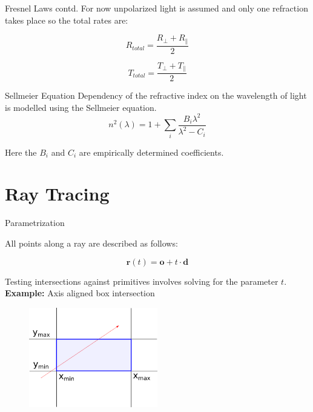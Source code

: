 \documentclass[aspectratio=43,t]{beamer}
\begin{document}
	\begin{frame}[fragile]{Fresnel Laws contd.}
		For now unpolarized light is assumed and only one refraction takes place so the total
		rates are:

		\begin{equation*}
			R_{total} = \frac{R_{\perp} + R_{\parallel}}{2}
		\end{equation*}

		\begin{equation*}
			T_{total} = \frac{T_{\perp} + T_{\parallel}}{2}
		\end{equation*}
    \end{frame}

	\begin{frame}[fragile]{Sellmeier Equation}
		Dependency of the refractive index on the wavelength of light is modelled
		using the Sellmeier equation.
		\begin{equation*}
        n^2(\lambda) = 1 + \sum_i \frac{B_i \lambda^2}{\lambda^2 - C_i}
    	\end{equation*}

		Here the $B_i$ and $C_i$ are empirically determined coefficients.
	\end{frame}


	\section{Ray Tracing}
    \begin{frame}[fragile]{Parametrization}
		
		All points along a ray are described as follows:

		\begin{equation*}
			\boldsymbol{r}(t) = \boldsymbol{o} + t \cdot \boldsymbol{d}
		\end{equation*}

		Testing intersections against primitives involves solving for the parameter $t$.\\
		\textbf{Example:} Axis aligned box intersection\\
		
		\begin{figure}
		\centering
		\includegraphics[width=0.5\textwidth]{images/aabb.png}
		\end{figure}
    \end{frame}
\end{document}
